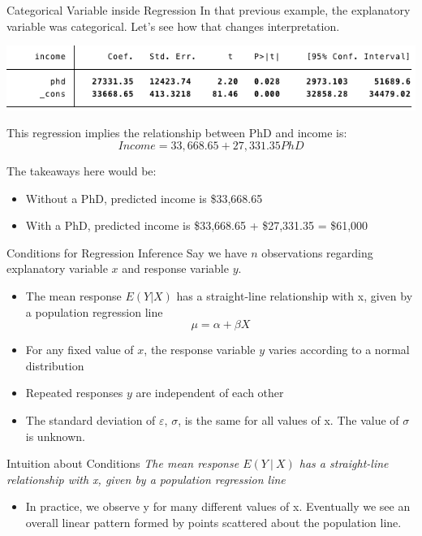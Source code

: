 \documentclass{beamer}
\begin{document}
\begin{frame}{Categorical Variable inside Regression}
	In that previous example, the explanatory variable was categorical. Let's see how that changes interpretation.
	
	\begin{center}
		\includegraphics[width=\textwidth]{incphd}
	\end{center}
	
	This regression implies the relationship between PhD and income is: \[ 
		Income = 33,668.65 + 27,331.35 PhD 
	\]
	
	The takeaways here would be:

	\begin{itemize}
		\item Without a PhD, predicted income is \$33,668.65
		\item With a PhD, predicted income is \$33,668.65 + \$27,331.35 = \$61,000
	\end{itemize}
\end{frame}


\begin{frame}{Conditions for Regression Inference}
	Say we have $n$ observations regarding explanatory variable $x$ and response variable $y$. 
	
	\begin{itemize}
		\item The mean response $E(Y|X)$ has a \alert{straight-line relationship} with x, given by a population regression line $$\mu=\alpha+\beta X$$
		
		\item For any fixed value of $x$, the response variable $y$ varies according to a normal distribution
		
		\item Repeated responses $y$ are independent of each other
		
		\item The \alert{standard deviation} of $\varepsilon$, $\sigma$, is the same for all values of x. The value of $\sigma$ is unknown.
	\end{itemize}
\end{frame}



\begin{frame}{Intuition about Conditions}
	\textit{The mean response $E(Y \ \vert \ X)$ has a \alert{straight-line relationship} with x, given by a population regression line}
	
	\begin{itemize}
		\item In practice, we observe y for many different values of x. Eventually we see an overall linear pattern formed by points scattered about the population line. 
	\end{itemize}
\end{frame}
\end{document}
